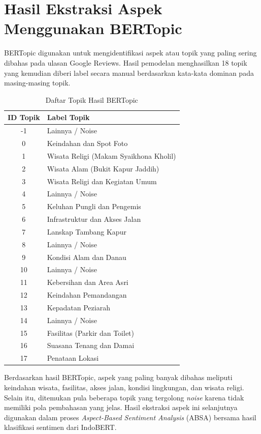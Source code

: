 \section{Hasil Ekstraksi Aspek Menggunakan BERTopic}

BERTopic digunakan untuk mengidentifikasi aspek atau topik yang paling sering dibahas pada ulasan Google Reviews. Hasil pemodelan menghasilkan 18 topik yang kemudian diberi label secara manual berdasarkan kata-kata dominan pada masing-masing topik.

\begin{table}[H]
\centering
\caption{Daftar Topik Hasil BERTopic}
\label{tab:hasil_bertopic}
\begin{tabular}{|c|p{9cm}|}
\hline
\textbf{ID Topik} & \textbf{Label Topik} \\
\hline
-1 & Lainnya / Noise \\
0 & Keindahan dan Spot Foto \\
1 & Wisata Religi (Makam Syaikhona Kholil) \\
2 & Wisata Alam (Bukit Kapur Jaddih) \\
3 & Wisata Religi dan Kegiatan Umum \\
4 & Lainnya / Noise \\
5 & Keluhan Pungli dan Pengemis \\
6 & Infrastruktur dan Akses Jalan \\
7 & Lanskap Tambang Kapur \\
8 & Lainnya / Noise \\
9 & Kondisi Alam dan Danau \\
10 & Lainnya / Noise \\
11 & Kebersihan dan Area Asri \\
12 & Keindahan Pemandangan \\
13 & Kepadatan Peziarah \\
14 & Lainnya / Noise \\
15 & Fasilitas (Parkir dan Toilet) \\
16 & Suasana Tenang dan Damai \\
17 & Penataan Lokasi \\
\hline
\end{tabular}
\end{table}

Berdasarkan hasil BERTopic, aspek yang paling banyak dibahas meliputi keindahan wisata, fasilitas, akses jalan, kondisi lingkungan, dan wisata religi. Selain itu, ditemukan pula beberapa topik yang tergolong \textit{noise} karena tidak memiliki pola pembahasan yang jelas. Hasil ekstraksi aspek ini selanjutnya digunakan dalam proses \textit{Aspect-Based Sentiment Analysis} (ABSA) bersama hasil klasifikasi sentimen dari IndoBERT.